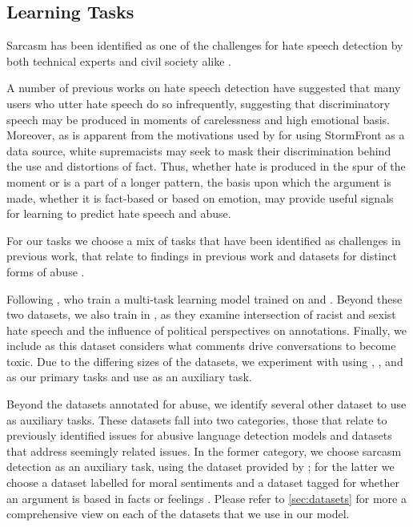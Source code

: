 \subsection{Learning Tasks}\label{sec:mtl_tasks}


Sarcasm has been identified as one of the challenges for hate speech detection by both technical experts and civil society alike \citep{Rottger:2021}.

A number of previous works on hate speech detection have suggested that many users who utter hate speech do so infrequently, suggesting that discriminatory speech may be produced in moments of carelessness and high emotional basis. Moreover, as is apparent from the motivations used by \citet{Garcia:2019} for using StormFront as a data source, white supremacists may seek to mask their discrimination behind the use and distortions of fact. Thus, whether hate is produced in the spur of the moment or is a part of a longer pattern, the basis upon which the argument is made, whether it is fact-based or based on emotion, may provide useful signals for learning to predict hate speech and abuse.

For our tasks we choose a mix of tasks that have been identified as challenges in previous work, that relate to findings in previous work \cite{Waseem-Hovy:2016,Davidson:2017,Schmidt:2017} and datasets for distinct forms of abuse \cite{Waseem:2016,Waseem-Hovy:2016,Davidson:2017,Wulczyn:2016}.

Following \citet{Waseem:2018}, who train a multi-task learning model trained on \citet{Waseem-Hovy:2016} and \citet{Davidson:2017}. Beyond these two datasets, we also train in \citet{Waseem:2016}, as they examine intersection of racist and sexist hate speech and the influence of political perspectives on annotations. Finally, we include \citet{Wulczyn:2016} as this dataset considers what comments drive conversations to become toxic. Due to the differing sizes of the datasets, we experiment with using \citet{Wulczyn:2016}, \citet{Davidson:2017}, and \citet{Waseem:2016} as our primary tasks and use \citet{Waseem-Hovy:2016} as an auxiliary task.

Beyond the datasets annotated for abuse, we identify several other dataset to use as auxiliary tasks. These datasets fall into two categories, those that relate to previously identified issues for abusive language detection models and datasets that address seemingly related issues. In the former category, we choose sarcasm detection as an auxiliary task, using the dataset provided by \citet{Oraby_sarcasm:2016}; for the latter we choose a dataset labelled for moral sentiments \citet{Hoover:2019} and a dataset tagged for whether an argument is based in facts or feelings \citet{Oraby_factfeel:2015}. Please refer to \autoref{sec:datasets} for more a comprehensive view on each of the datasets that we use in our model.

